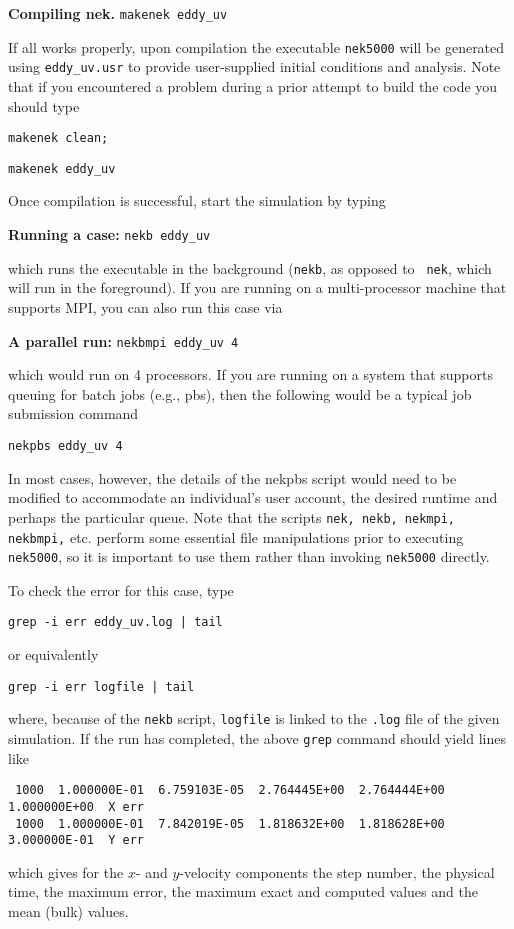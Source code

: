 {\bf Compiling nek.}
{\tt makenek eddy\_uv}

\noindent
If all works properly, upon compilation the executable {\tt nek5000} will be generated using {\tt eddy\_uv.usr} to provide
user-supplied initial conditions and analysis.  Note that if you encountered
a problem during a prior attempt to build the code you should type

{\tt makenek clean;}  

{\tt makenek eddy\_uv} 

\noindent
Once compilation is successful, start the simulation by typing
 

{\bf Running a case:}
{\tt nekb eddy\_uv } 

which runs the executable in the background ({\tt nekb}, as opposed to {\tt
nek}, which will run in the foreground).  
If you are running on a multi-processor machine that supports MPI, you
can also run this case via

{\bf A parallel run:}
{\tt nekbmpi eddy\_uv 4}

\noindent
which would run on 4 processors.    If you are running on a system
that supports queuing for batch jobs (e.g., pbs), then the following
would be a typical job submission command

{\tt nekpbs eddy\_uv 4}

In most cases, however, the details of the nekpbs script would need
to be modified to accommodate an individual's user account, the 
desired runtime and perhaps the particular queue.   Note that the
scripts {\tt nek, nekb, nekmpi, nekbmpi,} etc. perform some essential
file manipulations prior to executing {\tt nek5000}, so it is important
to use them rather than invoking {\tt nek5000} directly.


To check the error for this case, type
\begin{verbatim}
grep -i err eddy_uv.log | tail
\end{verbatim}
or equivalently
\begin{verbatim}
grep -i err logfile | tail
\end{verbatim}
where, because of the {\tt nekb} script, {\tt logfile} is 
linked to the {\tt .log} file of the given simulation. 
If the run has completed, the above {\tt grep} command should yield lines like
\scriptsize
\begin{verbatim}
 1000  1.000000E-01  6.759103E-05  2.764445E+00  2.764444E+00  1.000000E+00  X err
 1000  1.000000E-01  7.842019E-05  1.818632E+00  1.818628E+00  3.000000E-01  Y err
\end{verbatim}
\normalsize
which gives for the $x$- and $y$-velocity components the
step number, the physical time, the maximum error, the maximum exact
and computed values and the mean (bulk) values.

